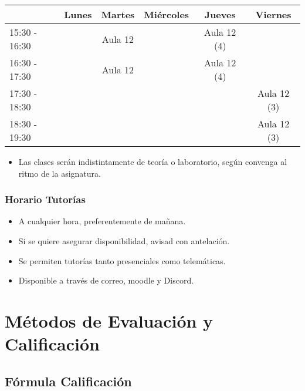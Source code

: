 \documentclass[a4paper,t,xcolor=pst,colortheme]{beamer}
\begin{document}
\begin{frame}[c]
\begin{small}
{\begin{center}
				\begin{tabular}{||l|c|c|c|c|c||}
					\hline \hline
					& Lunes & Martes  & Miércoles & Jueves      & Viernes     \\ \hline \hline
					15:30 - 16:30  &       & Aula 12 &           & Aula 12 (4) &             \\ \hline
					16:30 - 17:30  &       & Aula 12 &           & Aula 12 (4) &             \\ \hline
					17:30 - 18:30  &       &         &           &             & Aula 12 (3) \\ \hline
					18:30 - 19:30  &       &         &           &             & Aula 12 (3) \\ \hline
					\hline
				\end{tabular}
			\end{center}
		}
	\end{small}
	\begin{itemize}
		\item<3-> Las clases serán indistintamente de teoría o laboratorio, según convenga al ritmo de la asignatura.
	\end{itemize}
\end{frame}

\begin{frame}[c]
	\frametitle{Horario Tutorías}
	\begin{itemize}[<+->]
		\item A cualquier hora, preferentemente de mañana.
		\item Si se quiere asegurar disponibilidad, avisad con antelación.
		\item Se permiten tutorías tanto presenciales como telemáticas.
		\item Disponible a través de correo, moodle y \alert{Discord}.
	\end{itemize}
\end{frame}



\section{Métodos de Evaluación y Calificación}

\subsection{Fórmula Calificación}
\end{document}
